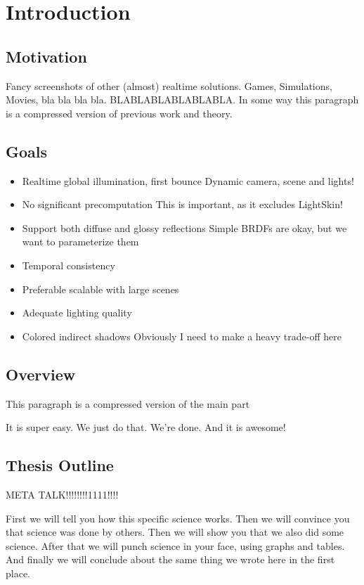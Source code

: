 \documentclass[thesis.tex]{subfiles}
\begin{document}
\chapter{Introduction}
\label{chap:introduction}

\section{Motivation}
Fancy screenshots of other (almost) realtime solutions.
Games, Simulations, Movies, bla bla bla bla.
BLABLABLABLABLABLA.
In some way this paragraph is a compressed version of previous work and theory.

\section{Goals}
\begin{itemize}
\item Realtime global illumination, first bounce
\subitem Dynamic camera, scene and lights!
\item No significant precomputation
\subitem This is important, as it excludes LightSkin!
\item Support both diffuse and glossy reflections
\subitem Simple BRDFs are okay, but we want to parameterize them 
\item Temporal consistency
\item Preferable scalable with large scenes
\item Adequate lighting quality
\item Colored indirect shadows
\subitem Obviously I need to make a heavy trade-off here
\end{itemize}

\section{Overview}
This paragraph is a compressed version of the main part

It is super easy. We just do that. We're done. And it is awesome!

\section{Thesis Outline}
META TALK!!!!!!!!1111!!!!

First we will tell you how this specific science works. Then we will convince you that science was done by others. Then we will show you that we also did some science. After that we will punch science in your face, using graphs and tables. And finally we will conclude about the same thing we wrote here in the first place.

\subfilebib %
\end{document}
